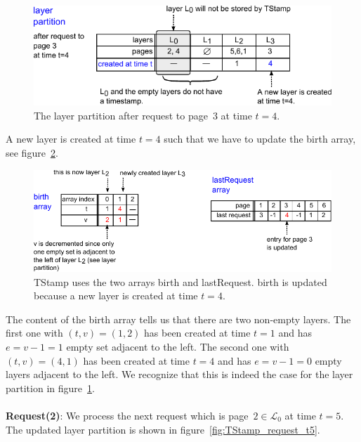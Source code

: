 \documentclass[a4paper,12pt, titlepage]{article}  %
\newcommand{\cl}{\mathcal{L}}   %
\begin{document}
\begin{figure}[htp]
	\centering
	\includegraphics[scale=1.0]{./figures/TStamp_layerPartition_t4.pdf}
	\caption{The layer partition after request to page~3 at time $t=4$.} 
	\label{fig:TStamp_layerPartition_t4}
\end{figure}

\noindent A new layer is created at time $t=4$ such that we have to update the birth array, 
see figure~\ref{fig:TStamp_birthArray_t4}.
\begin{figure}[htp]
	\centering
	\includegraphics[scale=1.0]{./figures/TStamp_birthArray_t4.pdf}
	\caption{TStamp uses the two arrays birth and lastRequest. birth is updated because a new layer is created at time $t=4$.} 
	\label{fig:TStamp_birthArray_t4}
\end{figure}
The content of the birth array tells us that there are two non-empty layers. The first one with $(t,v)=(1,2)$ has been created
at time $t=1$ and has $e=v-1=1$ empty set adjacent to the left. 
The second one with $(t,v)=(4,1)$ has been created at time $t=4$ and has $e=v-1=0$ empty layers
adjacent to the left. We recognize that this is indeed the case for the layer partition in figure~\ref{fig:TStamp_layerPartition_t4}.\\
\\
\noindent \textbf{Request(2)}: We process the next request which is page~$2\in \cl_0$ at time $t=5$. 
The updated layer partition is shown in figure~\ref{fig:TStamp_request_t5}.
\end{document}
